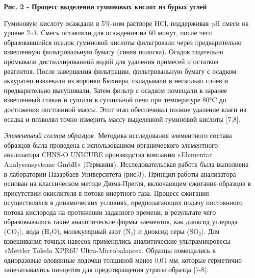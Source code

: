 {\bfseries Рис. 2 - Процесс выделения гуминовых кислот из бурых углей}

Гуминовую кислоту осаждали в 5\%-ном растворе HCl, поддерживая pH смеси
на уровне 2--3. Смесь оставляли для осаждения на 60 минут, после чего
образовавшийся осадок гуминовой кислоты фильтровали через предварительно
взвешенную фильтровальную бумагу (синяя полоска). Осадок тщательно
промывали дистиллированной водой для удаления примесей и остатков
реагентов. После завершения фильтрации, фильтровальную бумагу с осадком
аккуратно извлекали из воронки Бюхнера, складывали в несколько слоев и
предварительно высушивали. Затем фильтр с осадком помещали в заранее
взвешенный стакан и сушили в сушильной печи при температуре 80°C до
достижения постоянной массы. Этот этап обеспечивал полное удаление влаги
из осадка и позволял точно измерить массу выделенной гуминовой кислоты
{[}7,8{]}.

\emph{Элементный состав образцов.} Методика исследования элементного
состава образцов была проведена с использованием органического
элементного анализатора CHNS-O UNICUBE производства компании «Elementar
Analysensysteme GmbH» (Германия). Исследовательская работа была
выполнена в лаборатории Назарбаев Университета (рис.3). Принцип работы
анализатора основан на классическом методе Дюма-Прегля, включающем
сжигание образцов в присутствии окислителя в потоке инертного газа.
Процесс сжигания осуществлялся в динамических условиях, предполагающих
подачу постоянного потока кислорода на протяжении заданного времени, в
результате чего образовывались такие аналитические формы элементов, как
диоксид углерода (CO₂), вода (H₂O), молекулярный азот (N₂) и диоксид
серы (SO₂). Для взвешивания точных навесок применялись аналитические
ультрамикровесы «Mettler Toledo XPR6U Ultra-Microbalance». Образцы
помещались в одноразовые оловянные лодочки толщиной менее 0,01 мм,
которые герметично запечатывались пинцетом для предотвращения утраты
образца {[}7-8{]}.

